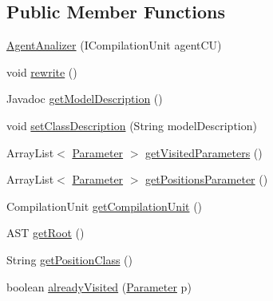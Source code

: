 \subsection*{Public Member Functions}
\begin{DoxyCompactItemize}
\item 
\hyperlink{classit_1_1isislab_1_1masonassisteddocumentation_1_1mason_1_1analizer_1_1_agent_analizer_a73ca1a318ae1635984ceced89e3f8d1d}{Agent\-Analizer} (I\-Compilation\-Unit agent\-C\-U)
\item 
void \hyperlink{classit_1_1isislab_1_1masonassisteddocumentation_1_1mason_1_1analizer_1_1_agent_analizer_aa1cf97eff47c73e305fdd540a512a88c}{rewrite} ()
\item 
Javadoc \hyperlink{classit_1_1isislab_1_1masonassisteddocumentation_1_1mason_1_1analizer_1_1_agent_analizer_ae8de4d1c4186a27f567257c4b85c3f1c}{get\-Model\-Description} ()
\item 
void \hyperlink{classit_1_1isislab_1_1masonassisteddocumentation_1_1mason_1_1analizer_1_1_agent_analizer_aaef67e385b42699bd863f505be5df17d}{set\-Class\-Description} (String model\-Description)
\item 
Array\-List$<$ \hyperlink{classit_1_1isislab_1_1masonassisteddocumentation_1_1mason_1_1analizer_1_1_parameter}{Parameter} $>$ \hyperlink{classit_1_1isislab_1_1masonassisteddocumentation_1_1mason_1_1analizer_1_1_agent_analizer_a76b619307dd702b85fc422f231fac76a}{get\-Visited\-Parameters} ()
\item 
Array\-List$<$ \hyperlink{classit_1_1isislab_1_1masonassisteddocumentation_1_1mason_1_1analizer_1_1_parameter}{Parameter} $>$ \hyperlink{classit_1_1isislab_1_1masonassisteddocumentation_1_1mason_1_1analizer_1_1_agent_analizer_a351c38491d7f706177c4c76478cabd6d}{get\-Positions\-Parameter} ()
\item 
Compilation\-Unit \hyperlink{classit_1_1isislab_1_1masonassisteddocumentation_1_1mason_1_1analizer_1_1_agent_analizer_a452c584a7035bc8c4a550f4e86db8266}{get\-Compilation\-Unit} ()
\item 
A\-S\-T \hyperlink{classit_1_1isislab_1_1masonassisteddocumentation_1_1mason_1_1analizer_1_1_agent_analizer_a1ac3fc1c6fdf3133e81fba94fe13c01d}{get\-Root} ()
\item 
String \hyperlink{classit_1_1isislab_1_1masonassisteddocumentation_1_1mason_1_1analizer_1_1_agent_analizer_a3e46e6754b6575579be1a9ac062641fa}{get\-Position\-Class} ()
\item 
boolean \hyperlink{classit_1_1isislab_1_1masonassisteddocumentation_1_1mason_1_1analizer_1_1_agent_analizer_a3e5ea2154f20535f5bd33db685cf045c}{already\-Visited} (\hyperlink{classit_1_1isislab_1_1masonassisteddocumentation_1_1mason_1_1analizer_1_1_parameter}{Parameter} p)

\end{DoxyCompactItemize}
